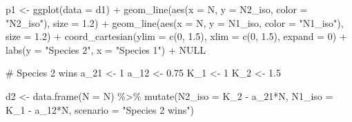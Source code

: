 \documentclass[
  letterpaper,
  DIV=11,
  numbers=noendperiod]{scrartcl}
\newenvironment{Shaded}{\begin{snugshade}}{\end{snugshade}}
\newcommand{\AttributeTok}[1]{\textcolor[rgb]{0.40,0.45,0.13}{#1}}
\newcommand{\CommentTok}[1]{\textcolor[rgb]{0.37,0.37,0.37}{#1}}
\newcommand{\ConstantTok}[1]{\textcolor[rgb]{0.56,0.35,0.01}{#1}}
\newcommand{\DecValTok}[1]{\textcolor[rgb]{0.68,0.00,0.00}{#1}}
\newcommand{\FloatTok}[1]{\textcolor[rgb]{0.68,0.00,0.00}{#1}}
\newcommand{\FunctionTok}[1]{\textcolor[rgb]{0.28,0.35,0.67}{#1}}
\newcommand{\NormalTok}[1]{\textcolor[rgb]{0.00,0.23,0.31}{#1}}
\newcommand{\OtherTok}[1]{\textcolor[rgb]{0.00,0.23,0.31}{#1}}
\newcommand{\SpecialCharTok}[1]{\textcolor[rgb]{0.37,0.37,0.37}{#1}}
\newcommand{\StringTok}[1]{\textcolor[rgb]{0.13,0.47,0.30}{#1}}
\begin{document}
\begin{Shaded}
\begin{Highlighting}[]
\NormalTok{p1 }\OtherTok{\textless{}{-}} \FunctionTok{ggplot}\NormalTok{(}\AttributeTok{data =}\NormalTok{ d1) }\SpecialCharTok{+}
  \FunctionTok{geom\_line}\NormalTok{(}\FunctionTok{aes}\NormalTok{(}\AttributeTok{x =}\NormalTok{ N, }\AttributeTok{y =}\NormalTok{ N2\_iso, }\AttributeTok{color =} \StringTok{"N2\_iso"}\NormalTok{), }\AttributeTok{size =} \FloatTok{1.2}\NormalTok{) }\SpecialCharTok{+}
  \FunctionTok{geom\_line}\NormalTok{(}\FunctionTok{aes}\NormalTok{(}\AttributeTok{x =}\NormalTok{ N, }\AttributeTok{y =}\NormalTok{ N1\_iso, }\AttributeTok{color =} \StringTok{"N1\_iso"}\NormalTok{), }\AttributeTok{size =} \FloatTok{1.2}\NormalTok{) }\SpecialCharTok{+}
  \FunctionTok{coord\_cartesian}\NormalTok{(}\AttributeTok{ylim =} \FunctionTok{c}\NormalTok{(}\DecValTok{0}\NormalTok{, }\FloatTok{1.5}\NormalTok{), }\AttributeTok{xlim =} \FunctionTok{c}\NormalTok{(}\DecValTok{0}\NormalTok{, }\FloatTok{1.5}\NormalTok{), }\AttributeTok{expand =} \DecValTok{0}\NormalTok{) }\SpecialCharTok{+}
  \FunctionTok{labs}\NormalTok{(}\AttributeTok{y =} \StringTok{"Species 2"}\NormalTok{, }\AttributeTok{x =} \StringTok{"Species 1"}\NormalTok{) }\SpecialCharTok{+}
  \ConstantTok{NULL}

\CommentTok{\# Species 2 wins}
\NormalTok{a\_21 }\OtherTok{\textless{}{-}} \DecValTok{1}
\NormalTok{a\_12 }\OtherTok{\textless{}{-}} \FloatTok{0.75}
\NormalTok{K\_1 }\OtherTok{\textless{}{-}} \DecValTok{1}
\NormalTok{K\_2 }\OtherTok{\textless{}{-}} \FloatTok{1.5}

\NormalTok{d2 }\OtherTok{\textless{}{-}} \FunctionTok{data.frame}\NormalTok{(}\AttributeTok{N =}\NormalTok{ N) }\SpecialCharTok{\%\textgreater{}\%} 
  \FunctionTok{mutate}\NormalTok{(}\AttributeTok{N2\_iso =}\NormalTok{ K\_2 }\SpecialCharTok{{-}}\NormalTok{ a\_21}\SpecialCharTok{*}\NormalTok{N,}
         \AttributeTok{N1\_iso =}\NormalTok{ K\_1 }\SpecialCharTok{{-}}\NormalTok{ a\_12}\SpecialCharTok{*}\NormalTok{N,}
         \AttributeTok{scenario =} \StringTok{"Species 2 wins"}\NormalTok{)}


\end{Highlighting}
\end{Shaded}
\end{document}

